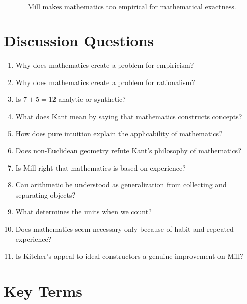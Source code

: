 \documentclass[11pt]{article}
\begin{document}
\[
\boxed{
\text{Mill makes mathematics too empirical for mathematical exactness.}
}
\]

\section*{Discussion Questions}

\begin{enumerate}[leftmargin=2em]
    \item Why does mathematics create a problem for empiricism?
    \item Why does mathematics create a problem for rationalism?
    \item Is \(7+5=12\) analytic or synthetic?
    \item What does Kant mean by saying that mathematics constructs concepts?
    \item How does pure intuition explain the applicability of mathematics?
    \item Does non-Euclidean geometry refute Kant's philosophy of mathematics?
    \item Is Mill right that mathematics is based on experience?
    \item Can arithmetic be understood as generalization from collecting and separating objects?
    \item What determines the units when we count?
    \item Does mathematics seem necessary only because of habit and repeated experience?
    \item Is Kitcher's appeal to ideal constructors a genuine improvement on Mill?
\end{enumerate}

\section*{Key Terms}
\end{document}
